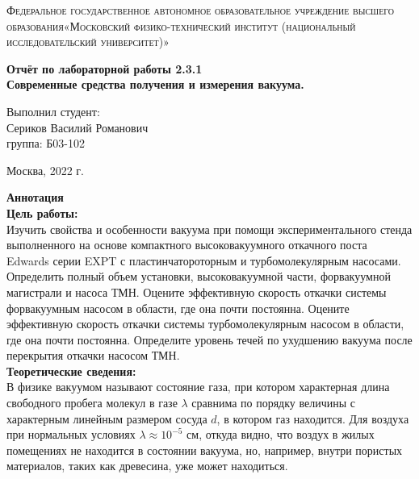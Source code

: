 \documentclass[a4paper, 12pt]{article}%
\begin{document}
	\begin{titlepage}
		\begin{center}
			\textsc{Федеральное государственное автономное образовательное учреждение высшего образования«Московский физико-технический институт (национальный исследовательский университет)»\\[5mm]
			}
			
			\vfill
			
			\textbf{Отчёт по лабораторной работы 2.3.1\\[3mm]
				Современные средства
				получения и измерения вакуума.
				\\[50mm]
			}
			
		\end{center}
		
		\hfill
		\begin{minipage}{.5\textwidth}
			Выполнил студент:\\[2mm]
			Сериков Василий Романович\\[2mm]
			группа: Б03-102\\[5mm]
			
		\end{minipage}
		\vfill
		\begin{center}
			Москва, 2022 г.
		\end{center}
		
	\end{titlepage}
	
	\newpage
	\textbf{Аннотация}\\
	
	
	\textbf{Цель работы: }\\
	
	
	Изучить свойства и особенности вакуума при помощи экспериментального стенда выполненного на основе компактного высоковакуумного откачного поста Edwards серии EXPT с пластинчатороторным и турбомолекулярным насосами. Определить полный объем установки, высоковакуумной части, форвакуумной магистрали и насоса ТМН. Оцените эффективную скорость откачки системы форвакуумным насосом в области, где она почти постоянна. Оцените эффективную скорость откачки системы турбомолекулярным насосом в области, где она почти постоянна. Определите уровень течей по ухудшению вакуума после перекрытия откачки насосом ТМН.\\
	
	
	
	
	
	\textbf{Теоретические сведения: } \\
	
	
	В физике вакуумом называют состояние газа, при котором характерная длина свободного пробега молекул в газе $\lambda$ сравнима по порядку
	величины с характерным линейным размером сосуда $d$, в котором газ
	находится. Для воздуха при нормальных условиях $\lambda \approx 10^{-5}$ см, откуда
	видно, что воздух в жилых помещениях не находится в состоянии вакуума, но, например, внутри пористых материалов, таких как древесина, уже
	может находиться.
	
\end{document}
